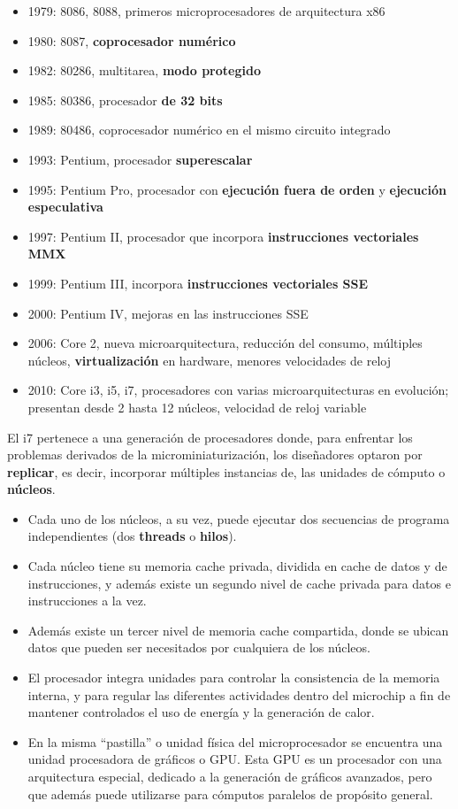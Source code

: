 \documentclass[spanish,A4,]{article}
\begin{document}
\begin{itemize}
\itemsep1pt\parskip0pt
\item
  1979: 8086, 8088, primeros microprocesadores de arquitectura x86
\item
  1980: 8087, \textbf{coprocesador numérico}
\item
  1982: 80286, multitarea, \textbf{modo protegido}
\item
  1985: 80386, procesador \textbf{de 32 bits}
\item
  1989: 80486, coprocesador numérico en el mismo circuito integrado
\item
  1993: Pentium, procesador \textbf{superescalar}
\item
  1995: Pentium Pro, procesador con \textbf{ejecución fuera de orden} y
  \textbf{ejecución especulativa}
\item
  1997: Pentium II, procesador que incorpora \textbf{instrucciones
  vectoriales MMX}
\item
  1999: Pentium III, incorpora \textbf{instrucciones vectoriales SSE}
\item
  2000: Pentium IV, mejoras en las instrucciones SSE
\item
  2006: Core 2, nueva microarquitectura, reducción del consumo,
  múltiples núcleos, \textbf{virtualización} en hardware, menores
  velocidades de reloj
\item
  2010: Core i3, i5, i7, procesadores con varias microarquitecturas en
  evolución; presentan desde 2 hasta 12 núcleos, velocidad de reloj
  variable
\end{itemize}

El i7 pertenece a una generación de procesadores donde, para enfrentar
los problemas derivados de la microminiaturización, los diseñadores
optaron por \textbf{replicar}, es decir, incorporar múltiples instancias
de, las unidades de cómputo o \textbf{núcleos}.

\begin{itemize}
\item
  Cada uno de los núcleos, a su vez, puede ejecutar dos secuencias de
  programa independientes (dos \textbf{threads} o \textbf{hilos}).
\item
  Cada núcleo tiene su memoria cache privada, dividida en cache de datos
  y de instrucciones, y además existe un segundo nivel de cache privada
  para datos e instrucciones a la vez.
\item
  Además existe un tercer nivel de memoria cache compartida, donde se
  ubican datos que pueden ser necesitados por cualquiera de los núcleos.
\item
  El procesador integra unidades para controlar la consistencia de la
  memoria interna, y para regular las diferentes actividades dentro del
  microchip a fin de mantener controlados el uso de energía y la
  generación de calor.
\item
  En la misma ``pastilla'' o unidad física del microprocesador se
  encuentra una unidad procesadora de gráficos o GPU. Esta GPU es un
  procesador con una arquitectura especial, dedicado a la generación de
  gráficos avanzados, pero que además puede utilizarse para cómputos
  paralelos de propósito general.
\end{itemize}
\end{document}

